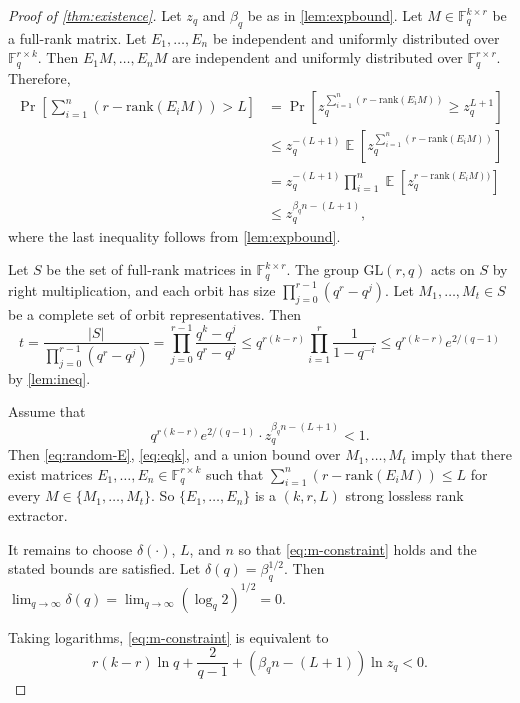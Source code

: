 \documentclass[11pt]{article}
\newcommand{\ex}{\mathop{{}\mathbb{E}}}
\newcommand{\rank}{\mathrm{rank}}
\newcommand{\F}{\mathbb{F}}
\newcommand{\GL}{\mathrm{GL}}
\begin{document}
\begin{proof}[Proof of \cref{thm:existence}]
Let $z_q$ and $\beta_q$ be as in \cref{lem:expbound}.
Let $M\in \F_q^{k\times r}$ be a full-rank matrix.
Let $E_1,\dots,E_n$ be independent and uniformly distributed over $\F_q^{r\times k}$. Then $E_1M,\dots,E_n M$ are independent and
uniformly distributed over $\F_q^{r\times r}$. Therefore,
\begin{equation}\label{eq:random-E}
\begin{aligned}
\Pr\left[\sum_{i=1}^n(r-\rank(E_iM))>L\right]
&=\Pr\left[z_q^{\sum_{i=1}^n(r-\rank(E_iM))}\geq z_q^{L+1}\right]\\
&\leq z_q^{-(L+1)}\ex\left[z_q^{\sum_{i=1}^n(r-\rank(E_iM))}\right]\\
&=z_q^{-(L+1)}\prod_{i=1}^n \ex\left[z_q^{r-\rank(E_iM))}\right]\\
&\leq z_q^{\beta_q n-(L+1)},
\end{aligned}
\end{equation}
where the last inequality follows from \cref{lem:expbound}.

Let $S$ be the set of full-rank matrices in $\F_q^{k\times r}$.
The group $\GL(r,q)$ acts on $S$ by right multiplication, and each orbit has size
$\prod_{j=0}^{r-1}(q^r-q^j)$. Let $M_1,\dots,M_t\in S$ be a complete set of orbit representatives.
Then
\begin{equation}\label{eq:eqk}
t
=\frac{|S|}{\prod_{j=0}^{r-1}(q^r-q^j)}
=\prod_{j=0}^{r-1}\frac{q^k-q^j}{q^r-q^j}
\le q^{r(k-r)}\prod_{i=1}^r\frac{1}{1-q^{-i}}
\le q^{r(k-r)}e^{2/(q-1)}
\end{equation}
by \cref{lem:ineq}.

Assume that
\begin{equation}\label{eq:m-constraint}
q^{r(k-r)}e^{2/(q-1)}\cdot
z_q^{\beta_q n-(L+1)}<1.
\end{equation}
Then \eqref{eq:random-E}, \eqref{eq:eqk}, and a union bound over
$M_1,\dots,M_t$ imply that there exist matrices $E_1,\dots,E_n\in\F_q^{r\times k}$
such that $\sum_{i=1}^n(r-\rank(E_iM))\le L$ for every $M\in\{M_1,\dots,M_t\}$.
So $\{E_1,\dots,E_n\}$ is a $(k,r,L)$ strong lossless rank extractor.

It remains to choose $\delta(\cdot)$, $L$, and $n$ so that \eqref{eq:m-constraint} holds and the stated bounds are satisfied.
Let $\delta(q)=\beta_q^{1/2}$. Then $\lim_{q\to\infty} \delta(q)=\lim_{q\to\infty}(\log_q 2)^{1/2}=0$.

Taking logarithms, \eqref{eq:m-constraint} is equivalent to
\begin{equation}\label{eq:m-constraint-2}
r(k-r)\ln q+\frac{2}{q-1}
+(\beta_q n-(L+1))\ln z_q<0.
\end{equation}



\end{proof}
\end{document}
